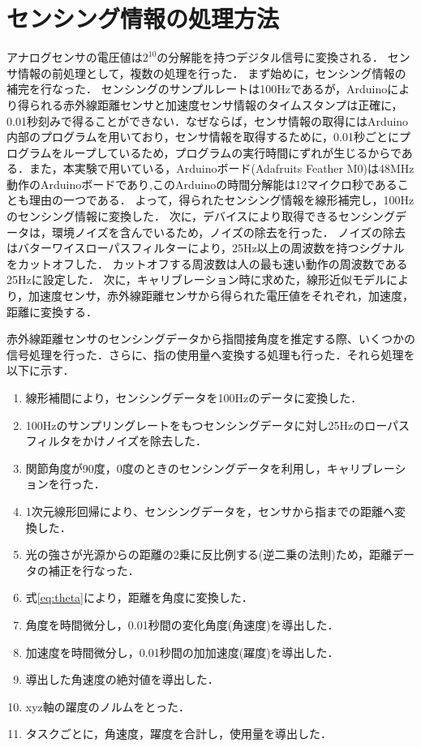 \section{センシング情報の処理方法}
アナログセンサの電圧値は$2^{10}$の分解能を持つデジタル信号に変換される．
センサ情報の前処理として，複数の処理を行った．
まず始めに，センシング情報の補完を行なった．
センシングのサンプルレートは100Hzであるが，Arduinoにより得られる赤外線距離センサと加速度センサ情報のタイムスタンプは正確に，0.01秒刻みで得ることができない．なぜならば，センサ情報の取得にはArduino内部のプログラムを用いており，センサ情報を取得するために，0.01秒ごとにプログラムをループしているため，プログラムの実行時間にずれが生じるからである．また，本実験で用いている，Arduinoボード(Adafruits Feather M0)は48MHz動作のArduinoボードであり,このArduinoの時間分解能は12マイクロ秒であることも理由の一つである．
よって，得られたセンシング情報を線形補完し，100Hzのセンシング情報に変換した．
次に，デバイスにより取得できるセンシングデータは，環境ノイズを含んでいるため，ノイズの除去を行った．
ノイズの除去はバターワイスローパスフィルターにより，25Hz以上の周波数を持つシグナルをカットオフした．
カットオフする周波数は人の最も速い動作の周波数である25Hz\cite{Friedman2014,VanGalen1990,Mason2001,Simone2007}に設定した．
次に，キャリブレーション時に求めた，線形近似モデルにより，加速度センサ，赤外線距離センサから得られた電圧値をそれぞれ，加速度，距離に変換する．



赤外線距離センサのセンシングデータから指間接角度を推定する際、いくつかの信号処理を行った．さらに、指の使用量へ変換する処理も行った．それら処理を以下に示す．

\begin{enumerate}
 \item 線形補間により，センシングデータを100Hzのデータに変換した．
 \item 100Hzのサンプリングレートをもつセンシングデータに対し25Hzのローパスフィルタをかけノイズを除去した．
 \item 関節角度が90度，0度のときのセンシングデータを利用し，キャリブレーションを行った．
 \item 1次元線形回帰により、センシングデータを，センサから指までの距離へ変換した．
 \item 光の強さが光源からの距離の2乗に反比例する(逆二乗の法則)ため，距離データの補正を行なった．
 \item 式\ref{eq:theta}により，距離を角度に変換した．
 \item 角度を時間微分し，0.01秒間の変化角度(角速度)を導出した．
 \item 加速度を時間微分し，0.01秒間の加加速度(躍度)を導出した．
 \item 導出した角速度の絶対値を導出した．
 \item xyz軸の躍度のノルムをとった．
 \item タスクごとに，角速度，躍度を合計し，使用量を導出した．
\end{enumerate}


